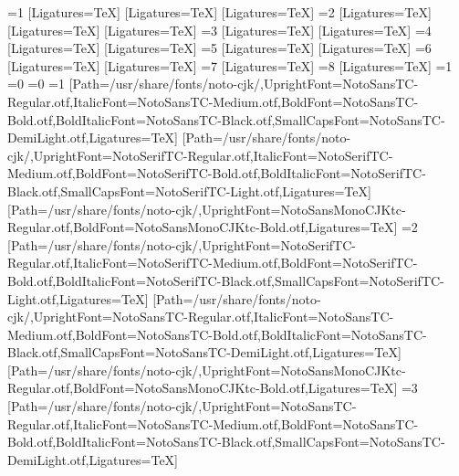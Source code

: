 \usepackage{unicode-math}
\SetMathFont
\ifnum\value{Fonts}=1
\setmainfont{TeX Gyre Heros}[Ligatures=TeX]
\setsansfont{TeX Gyre Termes}[Ligatures=TeX]
\setmonofont{TeX Gyre Cursor}[Ligatures=TeX]
\else\ifnum\value{Fonts}=2
\setmainfont{TeX Gyre Termes}[Ligatures=TeX]
\setsansfont{TeX Gyre Heros}[Ligatures=TeX]
\setmonofont{TeX Gyre Cursor}[Ligatures=TeX]
\else\ifnum\value{Fonts}=3
\setmainfont{TeX Gyre Heros}[Ligatures=TeX]
\setmonofont{TeX Gyre Cursor}[Ligatures=TeX]
\else\ifnum\value{Fonts}=4
\setmainfont{TeX Gyre Termes}[Ligatures=TeX]
\setmonofont{TeX Gyre Cursor}[Ligatures=TeX]
\else\ifnum\value{Fonts}=5
\setmainfont{TeX Gyre Heros}[Ligatures=TeX]
\setsansfont{TeX Gyre Termes}[Ligatures=TeX]
\else\ifnum\value{Fonts}=6
\setmainfont{TeX Gyre Termes}[Ligatures=TeX]
\setsansfont{TeX Gyre Heros}[Ligatures=TeX]
\else\ifnum\value{Fonts}=7
\setmainfont{TeX Gyre Heros}[Ligatures=TeX]
\else\ifnum\value{Fonts}=8
\setmainfont{TeX Gyre Termes}[Ligatures=TeX]
\fi\fi\fi\fi\fi\fi\fi\fi
\ifnum\value{CJK}=1
\ifx\luatexversion\undefined
\ifnum\value{CJKFonts}=0\else
\ifnum\value{CJKLanguage}=0
\ifnum\value{CJKFonts}=1
[Path=/usr/share/fonts/noto-cjk/,UprightFont=NotoSansTC-Regular.otf,ItalicFont=NotoSansTC-Medium.otf,BoldFont=NotoSansTC-Bold.otf,BoldItalicFont=NotoSansTC-Black.otf,SmallCapsFont=NotoSansTC-DemiLight.otf,Ligatures=TeX]
[Path=/usr/share/fonts/noto-cjk/,UprightFont=NotoSerifTC-Regular.otf,ItalicFont=NotoSerifTC-Medium.otf,BoldFont=NotoSerifTC-Bold.otf,BoldItalicFont=NotoSerifTC-Black.otf,SmallCapsFont=NotoSerifTC-Light.otf,Ligatures=TeX]
[Path=/usr/share/fonts/noto-cjk/,UprightFont=NotoSansMonoCJKtc-Regular.otf,BoldFont=NotoSansMonoCJKtc-Bold.otf,Ligatures=TeX]
\else\ifnum\value{CJKFonts}=2
[Path=/usr/share/fonts/noto-cjk/,UprightFont=NotoSerifTC-Regular.otf,ItalicFont=NotoSerifTC-Medium.otf,BoldFont=NotoSerifTC-Bold.otf,BoldItalicFont=NotoSerifTC-Black.otf,SmallCapsFont=NotoSerifTC-Light.otf,Ligatures=TeX]
[Path=/usr/share/fonts/noto-cjk/,UprightFont=NotoSansTC-Regular.otf,ItalicFont=NotoSansTC-Medium.otf,BoldFont=NotoSansTC-Bold.otf,BoldItalicFont=NotoSansTC-Black.otf,SmallCapsFont=NotoSansTC-DemiLight.otf,Ligatures=TeX]
[Path=/usr/share/fonts/noto-cjk/,UprightFont=NotoSansMonoCJKtc-Regular.otf,BoldFont=NotoSansMonoCJKtc-Bold.otf,Ligatures=TeX]
\else\ifnum\value{CJKFonts}=3
[Path=/usr/share/fonts/noto-cjk/,UprightFont=NotoSansTC-Regular.otf,ItalicFont=NotoSansTC-Medium.otf,BoldFont=NotoSansTC-Bold.otf,BoldItalicFont=NotoSansTC-Black.otf,SmallCapsFont=NotoSansTC-DemiLight.otf,Ligatures=TeX]
